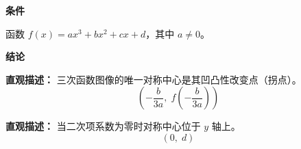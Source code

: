 \begin{statementbox}
	\textbf{\textcolor{CStatement}{条件}}
	\begin{description}[style=nextline, leftmargin=2.8em, labelsep=0.5em, itemsep=0.35em]
		\item[\textbf{\textcolor{CStatement}{条件 1（三次函数）：}}]
			函数 $f(x)=ax^3+bx^2+cx+d$，其中 $a\neq 0$。
	\end{description}
	\textbf{\textcolor{CStatement}{结论}}
	\begin{description}[style=nextline, leftmargin=2.8em, labelsep=0.5em, itemsep=0.45em]
		\item[\textbf{\textcolor{CStatement}{结论一（对称中心）：}}]
			\textbf{\textcolor{CStatement}{直观描述：}}
			三次函数图像的唯一对称中心是其凹凸性改变点（拐点）。
			\[
				\boxed{\left(-\frac{b}{3a},\; f\!\left(-\frac{b}{3a}\right)\right)}
			\]
		\item[\textbf{\textcolor{CStatement}{推广结论（b为零特例）：}}]
			\textbf{\textcolor{CStatement}{直观描述：}}
			当二次项系数为零时对称中心位于 $y$ 轴上。
			\[
				\boxed{(0,\; d)}
			\]
	\end{description}

\end{statementbox}

